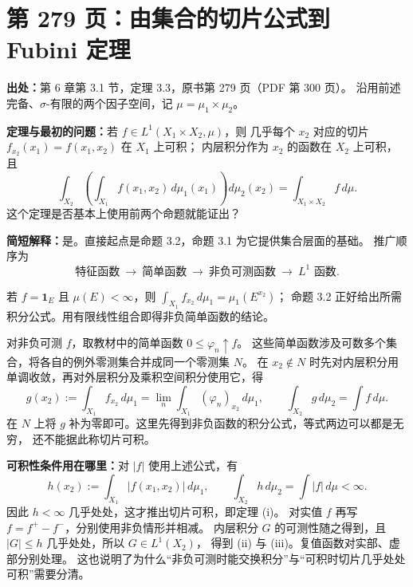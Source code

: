 \documentclass[UTF8,a4paper,11pt]{ctexart}
\begin{document}
\newpage
\section{第 279 页：由集合的切片公式到 Fubini 定理}
\label{note:stein-ch6-p279-fubini}
\textbf{出处：}第 6 章第 3.1 节，定理 3.3，原书第 279 页（PDF 第 300 页）。
沿用前述完备、$\sigma$-有限的两个因子空间，记 $\mu=\mu_1\times\mu_2$。

\textbf{定理与最初的问题：}若 $f\in L^1(X_1\times X_2,\mu)$，则
几乎每个 $x_2$ 对应的切片 $f_{x_2}(x_1)=f(x_1,x_2)$ 在 $X_1$ 上可积；
内层积分作为 $x_2$ 的函数在 $X_2$ 上可积，且
\[
\int_{X_2}\left(\int_{X_1}f(x_1,x_2)\,d\mu_1(x_1)\right)d\mu_2(x_2)
=\int_{X_1\times X_2}f\,d\mu.
\]
这个定理是否基本上使用前两个命题就能证出？

\textbf{简短解释：}是。直接起点是命题 3.2，命题 3.1 为它提供集合层面的基础。
推广顺序为
\[
\text{特征函数}\ \longrightarrow\ \text{简单函数}\
\longrightarrow\ \text{非负可测函数}\ \longrightarrow\ L^1\text{ 函数}.
\]

若 $f=\mathbf1_E$ 且 $\mu(E)<\infty$，则
$\int_{X_1}f_{x_2}\,d\mu_1=\mu_1(E^{x_2})$；
命题 3.2 正好给出所需积分公式。用有限线性组合即得非负简单函数的结论。

对非负可测 $f$，取教材中的简单函数 $0\leq\varphi_n\uparrow f$。
这些简单函数涉及可数多个集合，将各自的例外零测集合并成同一个零测集 $N$。
在 $x_2\notin N$ 时先对内层积分用单调收敛，再对外层积分及乘积空间积分使用它，得
\[
g(x_2):=\int_{X_1}f_{x_2}\,d\mu_1
=\lim_n\int_{X_1}(\varphi_n)_{x_2}\,d\mu_1,
\qquad
\int_{X_2}g\,d\mu_2=\int f\,d\mu.
\]
在 $N$ 上将 $g$ 补为零即可。这里先得到非负函数的积分公式，等式两边可以都是无穷，
还不能据此称切片可积。

\textbf{可积性条件用在哪里：}对 $|f|$ 使用上述公式，有
\[
h(x_2):=\int_{X_1}|f(x_1,x_2)|\,d\mu_1,\qquad
\int_{X_2}h\,d\mu_2=\int|f|\,d\mu<\infty.
\]
因此 $h<\infty$ 几乎处处，这才推出切片可积，即定理 (i)。
对实值 $f$ 再写 $f=f^+-f^-$，分别使用非负情形并相减。
内层积分 $G$ 的可测性随之得到，且 $|G|\leq h$ 几乎处处，所以 $G\in L^1(X_2)$，
得到 (ii) 与 (iii)。复值函数对实部、虚部分别处理。
这也说明了为什么“非负可测时能交换积分”与“可积时切片几乎处处可积”需要分清。
\end{document}
